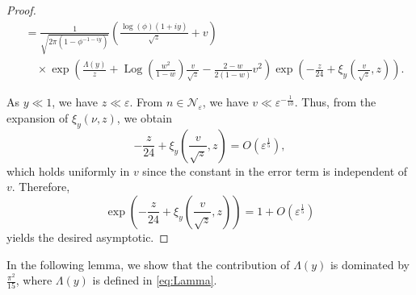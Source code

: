 \documentclass[11pt,reqno]{amsart}
\theoremstyle{remark}
\numberwithin{equation}{section}
\def\Log{\operatorname{Log}}
\def\Log{\operatorname{Log}}
\begin{document}
\begin{proof}
\begin{align*}
	&= \frac{1}{\sqrt{2\pi(1-\phi^{-1-iy})}}  \left( \frac{\log(\phi) (1+iy)}{\sqrt{z}} +  v \right) \\
	&\quad \times \exp\left(\frac{\Lambda (y)}{z} + \Log\left(\frac{w^2}{1-w}\right)\frac{v}{\sqrt{z}} - \frac{2-w}{2(1-w)}  v^2   \right) \exp\left(-\frac{z}{24} + \xi_y \left(\frac{v}{\sqrt{z}}, z\right) \right).
\end{align*}


As $y \ll 1$, we have $z \ll \varepsilon$. From $n \in \mathcal{N}_{\varepsilon}$, we have $v \ll \varepsilon^{-\frac{1}{10}}$. Thus, from the expansion of $\xi_y (\nu, z)$, we obtain
\[
	-\frac{z}{24} + \xi_y \left( \frac{v}{\sqrt{z}}, z\right) =  O\left(\varepsilon^{\frac{1}{5}}\right),
\]
which holds uniformly in $v$ since the constant in the error term is independent of $v$. Therefore,
\[
	\exp\left(-\frac{z}{24} + \xi_y \left( \frac{v}{\sqrt{z}}, z\right)\right) =  1+O\left(\varepsilon^{\frac{1}{5}}\right)
\] 
yields the desired asymptotic.
\end{proof}





In the following lemma, we show that the contribution of $\Lambda(y)$ is dominated by $\frac{\pi^2}{15}$, where $\Lambda(y)$ is defined in \eqref{eq:Lamma}.
\end{document}
